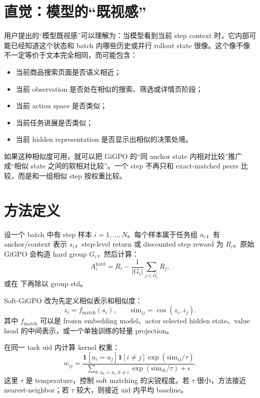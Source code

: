 \documentclass[10pt]{ctexart}
\begin{document}
\section{直觉：模型的“既视感”}
用户提出的“模型既视感”可以理解为：当模型看到当前 step context 时，它内部可能已经知道这个状态和 batch 内哪些历史或并行 rollout state 很像。这个像不像不一定等价于文本完全相同，而可能包含：
\begin{itemize}
  \item 当前商品搜索页面是否语义相近；
  \item 当前 observation 是否处在相似的搜索、筛选或详情页阶段；
  \item 当前 action space 是否类似；
  \item 当前任务进展是否类似；
  \item 当前 hidden representation 是否显示出相似的决策处境。
\end{itemize}

如果这种相似度可用，就可以把 GiGPO 的“同 anchor state 内相对比较”推广成“相似 state 之间的软相对比较”。一个 step 不再只和 exact-matched peers 比较，而是和一组相似 step 按权重比较。

\section{方法定义}
设一个 batch 中有 step 样本 $i=1,\dots,N$。每个样本属于任务组 $u_i$，有 anchor/context 表示 $s_i$，step-level return 或 discounted step reward 为 $R_i$。原始 GiGPO 会构造 hard group $G_i$，然后计算：
\begin{equation}
  A_i^{\mathrm{hard}} = R_i - \frac{1}{|G_i|}\sum_{j\in G_i} R_j,
\end{equation}
或在  下再除以 group std。

Soft-GiGPO 改为先定义相似表示和相似度：
\begin{equation}
  z_i=f_{\mathrm{match}}(s_i),\qquad
  \mathrm{sim}_{ij}=\cos(z_i,z_j).
\end{equation}
其中 $f_{\mathrm{match}}$ 可以是 frozen embedding model、actor selected hidden state、value head 的中间表示，或一个单独训练的轻量 projection。

在同一 task uid 内计算 kernel 权重：
\begin{equation}
  w_{ij}=\frac{\mathbf{1}[u_i=u_j]\mathbf{1}[i\ne j]\exp(\mathrm{sim}_{ij}/\tau)}
  {\sum_{k:u_k=u_i,k\ne i}\exp(\mathrm{sim}_{ik}/\tau)+\epsilon}.
\end{equation}
这里 $\tau$ 是 temperature，控制 soft matching 的尖锐程度。若 $\tau$ 很小，方法接近 nearest-neighbor；若 $\tau$ 较大，则接近 uid 内平均 baseline。
\end{document}
